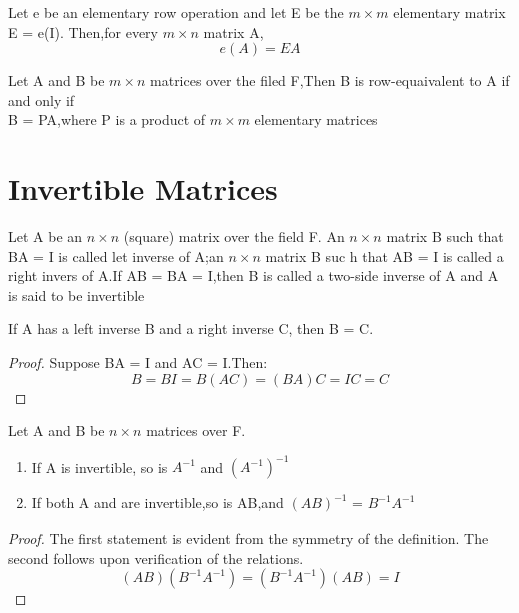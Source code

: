 \begin{theorem}
	Let e be an elementary row operation and let E be the $m \times m$ elementary matrix E = e(I). Then,for every $m \times n$ matrix A, \[
		e(A) = EA
	\]
\end{theorem}

\begin{corollary}
	Let A and B be $m \times n$ matrices over the filed F,Then B is row-equaivalent to A if and only if \\ B = PA,where P is a product of $m \times m$ elementary matrices
\end{corollary}

\section{Invertible Matrices}

\begin{definition}
	Let A be an $n \times n$ (square) matrix over the field F. An $n \times n$ matrix B such that BA = I is called let inverse of A;an $n \times n$ matrix B suc h that AB = I is called a right invers of A.If AB = BA = I,then B is called a two-side inverse of A and A is said to be invertible
\end{definition}

\begin{lemma}
	If A has a left inverse B and a right inverse C, then B = C.
	\begin{proof}
		Suppose BA = I and AC = I.Then: \[
			B = BI = B(AC) = (BA)C = IC = C
		\]
	\end{proof}
\end{lemma}

\begin{theorem}
	Let A and B be $n \times n$ matrices over F.
	\begin{enumerate}
		\item If A is invertible, so is $A_{}^{-1}$ and $(A_{}^{-1})^{-1}$
		\item If both A and  are invertible,so is AB,and $(AB)_{}^{-1}$ = $B_{}^{-1}A_{}^{-1}$

	\end{enumerate}
	\begin{proof}
		The first statement is evident from the symmetry of the definition. The second follows upon verification of the relations.
		\[
			(AB)(B_{}^{-1}A_{}^{-1}) = (B_{}^{-1}A_{}^{-1})(AB) = I
		\]
	\end{proof}
\end{theorem}


